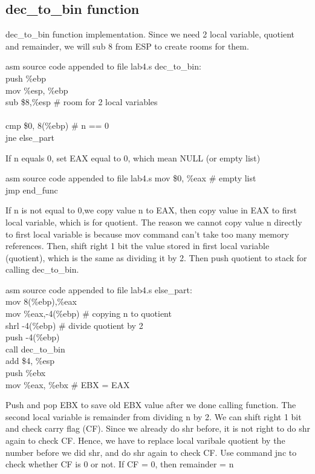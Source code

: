 \documentclass{article}
\begin{document}
\subsection{dec\_to\_bin function}
dec\_to\_bin function implementation. Since we need 2 local variable, quotient and remainder, we will sub 8 from ESP to create rooms for them.
\begin{GFT}{asm source code appended to file lab4.s}
\+dec\_to\_bin: \\
\+  push \%ebp\\
\+  mov \%esp, \%ebp\\
\+  sub \$8,\%esp 		\# room for 2 local variables\\
\+  \\
\+  cmp \$0, 8(\%ebp) 	\# n == 0\\
\+  jne else\_part\\
\end{GFT}
If n equals 0, set EAX equal to 0, which mean NULL (or empty list)
\begin{GFT}{asm source code appended to file lab4.s}
\+  mov \$0, \%eax		\# empty list\\
\+  jmp end\_func\\
\end{GFT}
If n is not equal to 0,we copy value n to EAX, then copy value in EAX to first local variable, which is for quotient. The reason we cannot copy value n directly to first local variable is because mov command can't take too many memory references. Then, shift right 1 bit the value stored in first local variable (quotient), which is the same as dividing it by 2. Then push quotient to stack for calling dec\_to\_bin.
\begin{GFT}{asm source code appended to file lab4.s}
\+else\_part:\\
\+  mov 8(\%ebp),\%eax\\
\+  mov \%eax,-4(\%ebp) 	\# copying n to quotient\\
\+  shrl -4(\%ebp) 	\# divide quotient by 2\\
\+  push -4(\%ebp)\\
\+  call dec\_to\_bin\\
\+  add \$4, \%esp\\
\+  push \%ebx\\
\+  mov \%eax, \%ebx	\# EBX = EAX\\
\end{GFT}
Push and pop EBX to save old EBX value after we done calling function.
The second local variable is remainder from dividing n by 2. We can shift right 1 bit and check carry flag (CF). Since we already do shr before, it is not right to do shr again to check CF. Hence, we have to replace local varibale quotient by the number before we did shr, and do shr again to check CF. Use command jnc to check whether CF is 0 or not. If CF = 0, then remainder = n%
\end{document}
